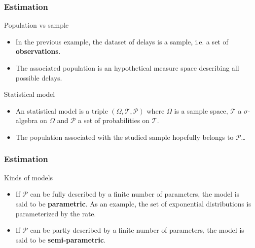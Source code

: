 \documentclass[main.tex]{subfiles}
\begin{document}
\begin{frame}
    \frametitle{Estimation}
\begin{block}{Population vs sample}
    \begin{itemize}
        \item<+-> In the previous example, the dataset of delays is a sample, i.e. a set of \textbf{observations}.
        \item<+-> The associated population is an hypothetical measure space describing all possible delays.
    \end{itemize}
\end{block}
\begin{block}{Statistical model}
   \begin{itemize}
    \item<+-> An statistical model is a triple $\left( \Omega, \mathcal{T}, \mathcal{P} \right)$ where $\Omega$ is a sample space,
    $\mathcal{T}$ a $\sigma$-algebra on $\Omega$ and $\mathcal{P}$ a set of probabilities on $\mathcal{T}.$
    \item<+-> The population associated with the studied sample hopefully belongs to $\mathcal{P}$\dots
   \end{itemize} 
\end{block}
\end{frame}
\begin{frame}
    \frametitle{Estimation}
\begin{block}{Kinds of models}
\begin{itemize}
    \item<+-> If $\mathcal{P}$ can be fully described by a finite number of parameters, the model is said to be \textbf{parametric}. As an example, 
    the set of exponential distributions is parameterized by the rate.
    \item<+-> If $\mathcal{P}$ can be partly described by a finite number of parameters, the model is said to be \textbf{semi-parametric}.
\end{itemize}    
\end{block}
    

\end{frame}
\end{document}
